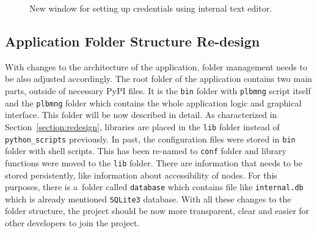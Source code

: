 {{{{\begin{figure}[H]
	\centering
	\caption{New window for setting up credentials using internal text editor.}
	\label{fig:credentials}
\end{figure}

\subsection{Application Folder Structure Re-design}
With changes to the architecture of the application, folder management needs to be also adjusted accordingly. The root folder of the application contains two main parts, outside of necessary PyPI files. It is the \texttt{bin} folder with \texttt{plbmng} script itself and the \texttt{plbmng} folder which contains the whole application logic and graphical interface. This folder will be now described in detail. As characterized in Section~\ref{section:redesign}, libraries are placed in the \texttt{lib} folder instead of \texttt{python\_scripts} previously. In past, the configuration files were stored in \texttt{bin} folder with shell scripts. This has been re-named to \texttt{conf} folder and library functions were moved to the \texttt{lib} folder. There are information that needs to be stored persistently, like information about accessibility of nodes. For this purposes, there is a~folder called \texttt{database} which contains file like \texttt{internal.db} which is already mentioned \texttt{SQLite3} database. With all these changes to the folder structure, the project should be now more transparent, clear and easier for other developers to join the project.

}}}}
